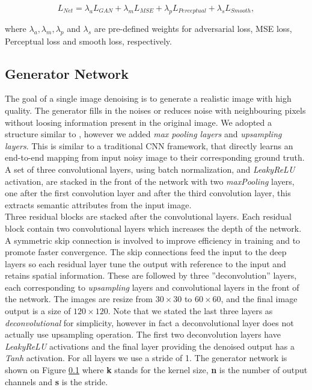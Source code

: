 \documentclass[journal]{IEEEtran}
\begin{document}
\begin{equation}
	L_{Net} = \lambda_a L_{GAN} + \lambda_m L_{MSE} + \lambda_p L_{Perceptual} + \lambda_s L_{Smooth},
\end{equation}

where $\lambda_a, \lambda_m, \lambda_p$ and $\lambda_s$ are pre-defined weights for adversarial loss, MSE loss, Perceptual loss and smooth loss, respectively.

\subsection{Generator Network}
\label{generator}
The goal of a single image denoising is to generate a realistic image with high quality.  The generator fills in the noises or reduces noise with neighbouring pixels without loosing information present in the original image.  We adopted a structure similar to \cite{alsaiari2019image}, however we added \emph{max pooling layers} and \emph{upsampling layers}.  This is similar to a traditional CNN framework, that directly learns an end-to-end mapping from input noisy image to their corresponding ground truth.  A set of three convolutional layers, using batch normalization, and \emph{LeakyReLU} activation, are stacked in the front of the network with two \emph{maxPooling} layers, one after the first convolution layer and after the third convolution layer, this extracts semantic attributes from the input image.\\
	Three residual blocks are stacked after the convolutional layers.  Each residual block contain two convolutional layers which increases the depth of the network.  A symmetric skip connection is involved to improve efficiency in training and to promote faster convergence.  The skip connections feed the input to the deep layers so each residual layer tune the output with reference to the input and retains spatial information.  These are followed by three ''deconvolution'' layers, each corresponding to \emph{upsampling} layers and convolutional layers in the front of the network.   The images are resize from $30 \times 30$ to $60 \times 60$, and the final image output is a size of $120 \times 120$.  Note that we stated the last three layers as \emph{deconvolutional} for simplicity, however in fact a deconvolutional layer does not actually use upsampling operation.  The first two deconvolution layers have \emph{LeakyReLU} activations and the final layer providing the denoised output has a \emph{Tanh} activation.  For all layers we use a stride of 1.  The generator network is shown on Figure \ref{generator} where \textbf{k} stands for the kernel size, \textbf{n} is the number of output channels and \textbf{s} is the stride. 
\end{document}
